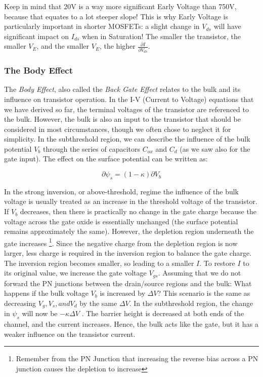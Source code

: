 Keep in mind that 20V is a way more significant Early Voltage than 750V, because that equates to a lot steeper slope! This is why Early Voltage is particularly important in shorter MOSFETs: a slight change in $V_{ds}$ will have significant impact on $I_{ds}$ when in Saturation! The smaller the transistor, the smaller $V_E$, and the smaller $V_E$, the higher $\frac{\partial I}{\partial V_{ds}}$. 

\subsubsection{The Body Effect}\label{sec:body_effect}

The \textit{Body Effect}, also called the \textit{Back Gate Effect} relates to the bulk and its influence on transistor operation. In the I-V (Current to Voltage) equations that we have derived so far, the terminal voltages of
the transistor are referenced to the bulk. However, the bulk is also an input to the transistor that should be considered in most circumstances, though we often chose to neglect it for simplicity.  In the subthreshold region, we can describe the influence of the bulk potential $V_b$ through the series of capacitors $C_{ox}$ and $C_d$ (as we saw also for the gate input).
The effect on the surface potential can be written as: 

\begin{equation}
    \partial \psi_s = (1-\kappa)\partial{V_b}
\end{equation}

In the strong inversion, or above-threshold, regime the influence of the
bulk voltage is usually treated as an increase in the threshold voltage of the
transistor. If $V_b$ decreases, then there is practically no change in the gate charge because the voltage across the gate oxide is essentially unchanged (the surface potential remains approximately the same). However, the depletion region underneath the gate increases \footnote{Remember from the PN Junction that increasing the reverse bias across a PN junction causes the depletion to increase}. Since the negative charge from the depletion region is now larger, less charge is required in the inversion region to balance the gate charge. The inversion region becomes smaller, so leading to a smaller $I$. To restore $I$ to its original value, we increase the gate voltage $V_{gs}$. Assuming that we do not forward the PN junctions between the drain/source regions and the bulk: What happens if the bulk voltage $V_b$ is increased by $\Delta V$?
This scenario is the same as decreasing $V_g , V_s, and V_d$ by the same $\Delta V$. In the subthreshold region, the change in $\psi_s$ will now be $-\kappa \Delta V$ . The barrier height is decreased at both ends of the channel, and the current increases. Hence, the bulk acts like the gate, but it has a weaker influence on the transistor current.

